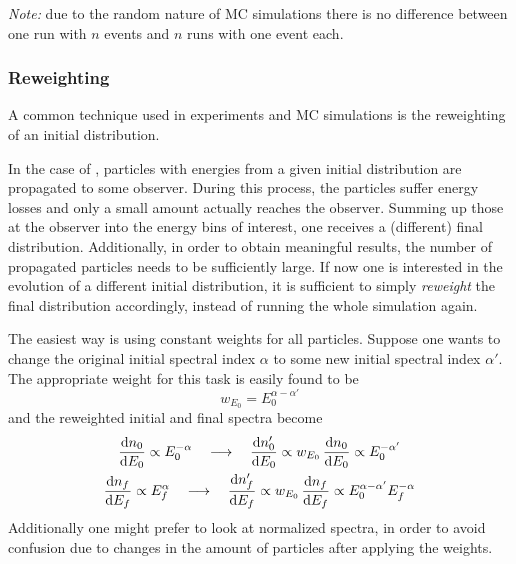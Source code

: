 \emph{Note:} due to the random nature of MC simulations there is no
difference between one run with $n$ events and $n$ runs with one event each.


\subsubsection{Reweighting}
A common technique used in experiments and MC simulations is the reweighting of
an initial distribution.

In the case of \CRPropa, particles with energies from a given initial
distribution are propagated to some observer. During this process, the
particles suffer energy losses and only a small amount actually reaches the
observer. Summing up those at the observer into the energy bins of
interest, one receives a (different) final distribution.
Additionally, in order to obtain meaningful results, the number of propagated
particles needs to be sufficiently large.
If now one is interested in the evolution of a different initial distribution,
it is sufficient to simply \emph{reweight} the final distribution accordingly,
instead of running the whole simulation again.

The easiest way is using constant weights for all particles. Suppose one wants
to change the original initial spectral index $\alpha$ to some new initial
spectral index $\alpha'$.
The appropriate weight for this task is easily found to be
\begin{equation}
    w_{E_0}=E_0^{\alpha-\alpha'}
    \label{eq:weight}
\end{equation}
and the reweighted initial and final spectra become
\begin{subequations}
\begin{gather}
    \dv{n_0}{E_0}\propto E_0^{-\alpha}
    \quad\longrightarrow\quad
    \dv{n'_0}{E_0}\propto w_{E_0}\,\dv{n_0}{E_0}\propto E_0^{-\alpha'} \\
    \dv{n_f}{E_f}\propto E_f^{\alpha}
    \quad\longrightarrow\quad
    \dv{n'_f}{E_f}\propto w_{E_0}\,\dv{n_f}{E_f}\propto E_0^{\alpha-\alpha'}E_f^{-\alpha}
\end{gather}
\label{eq:reweight}
\end{subequations}
Additionally one might prefer to look at normalized spectra, in order to avoid
confusion due to changes in the amount of particles after applying the weights.


